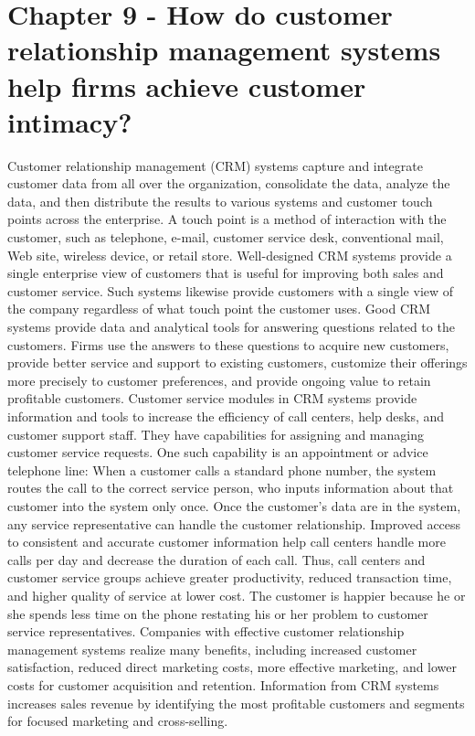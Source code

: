 \documentclass[12pt]{article}
\begin{document}
\section{Chapter 9 - How do customer relationship management systems help firms achieve customer intimacy?}
Customer relationship management (CRM) systems capture and integrate customer data from all over the organization, consolidate the data, analyze the data, and then distribute the results to various systems and customer touch points across the enterprise. A touch point  is a method of interaction with the customer, such as telephone, e-mail, customer service desk, conventional mail, Web site, wireless device, or retail store. Well-designed CRM systems provide a single enterprise view of customers that is useful for improving both sales and customer service. Such systems likewise provide customers with a single view of the company regardless of what touch point the customer uses. Good CRM systems provide data and analytical tools for answering questions related to the customers. Firms use the answers to these questions to acquire new customers, provide better service and support to existing customers, customize their offerings more precisely to customer preferences, and provide ongoing value to retain profitable customers. Customer service modules in CRM systems provide information and tools to increase the efficiency of call centers, help desks, and customer support staff. They have capabilities for assigning and managing customer service requests. One such capability is an appointment or advice telephone line: When a customer calls a standard phone number, the system routes the call to the correct service person, who inputs information about that customer into the system only once. Once the customer’s data are in the system, any service representative can handle the customer relationship. Improved access to consistent and accurate customer  information help call centers handle more calls per day and decrease the duration of each call. Thus, call centers and customer service groups achieve greater productivity, reduced transaction time, and higher quality of service at lower cost. The customer is happier because he or she spends less time on the phone restating his or her problem to customer service representatives. Companies with effective customer relationship management systems realize many benefits, including increased customer satisfaction, reduced direct marketing costs, more effective marketing, and lower costs for customer acquisition and retention. Information from CRM systems increases sales revenue by identifying the most profitable customers and segments for focused marketing and cross-selling.
\end{document}
